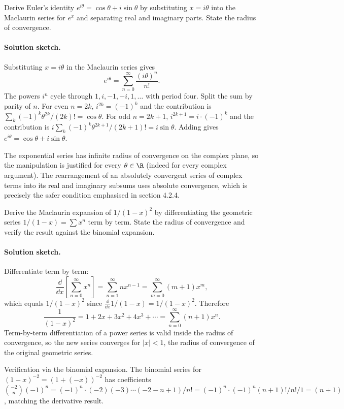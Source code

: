 \begin{exercise}
Derive Euler's identity $e^{i\theta} = \cos \theta + i \sin \theta$
by substituting $x = i\theta$ into the Maclaurin series for $e^{x}$
and separating real and imaginary parts. State the radius of
convergence.

\paragraph{Solution sketch.} Substituting $x = i\theta$ in the
Maclaurin series gives
\[
e^{i\theta} = \sum_{n=0}^{\infty} \frac{(i\theta)^{n}}{n!}.
\]
The powers $i^{n}$ cycle through $1, i, -1, -i, 1, \ldots$ with
period four. Split the sum by parity of $n$. For even $n = 2k$,
$i^{2k} = (-1)^{k}$ and the contribution is $\sum_{k} (-1)^{k}
\theta^{2k}/(2k)! = \cos\theta$. For odd $n = 2k+1$, $i^{2k+1} = i
\cdot (-1)^{k}$ and the contribution is $i \sum_{k} (-1)^{k}
\theta^{2k+1}/(2k+1)! = i \sin\theta$. Adding gives $e^{i\theta} =
\cos\theta + i \sin\theta$.

The exponential series has infinite radius of convergence on the
complex plane, so the manipulation is justified for every
$\theta \in \R$ (indeed for every complex argument). The
rearrangement of an absolutely convergent series of complex terms
into its real and imaginary subsums uses absolute convergence,
which is precisely the safer condition emphasised in section
4.2.4.
\end{exercise}

\begin{exercise}
Derive the Maclaurin expansion of $1/(1 - x)^{2}$ by differentiating
the geometric series $1/(1 - x) = \sum x^{n}$ term by term. State the
radius of convergence and verify the result against the binomial
expansion.

\paragraph{Solution sketch.} Differentiate term by term:
\[
\frac{\dd}{\dd x}\left[\sum_{n=0}^{\infty} x^{n}\right] =
\sum_{n=1}^{\infty} n x^{n-1} = \sum_{m=0}^{\infty} (m + 1) x^{m},
\]
which equals $1/(1 - x)^{2}$ since $\frac{\dd}{\dd x} 1/(1 - x)
= 1/(1 - x)^{2}$. Therefore
\[
\frac{1}{(1 - x)^{2}} = 1 + 2 x + 3 x^{2} + 4 x^{3} + \cdots
= \sum_{n=0}^{\infty} (n + 1) x^{n}.
\]
Term-by-term differentiation of a power series is valid inside the
radius of convergence, so the new series converges for $|x| < 1$,
the radius of convergence of the original geometric series.

Verification via the binomial expansion. The binomial series for
$(1 - x)^{-2} = (1 + (-x))^{-2}$ has coefficients
$\binom{-2}{n}(-1)^{n} = (-1)^{n} \cdot (-2)(-3) \cdots (-2 - n + 1)
/ n! = (-1)^{n} \cdot (-1)^{n} (n+1)!/n! / 1 = (n + 1)$, matching
the derivative result.
\end{exercise}

